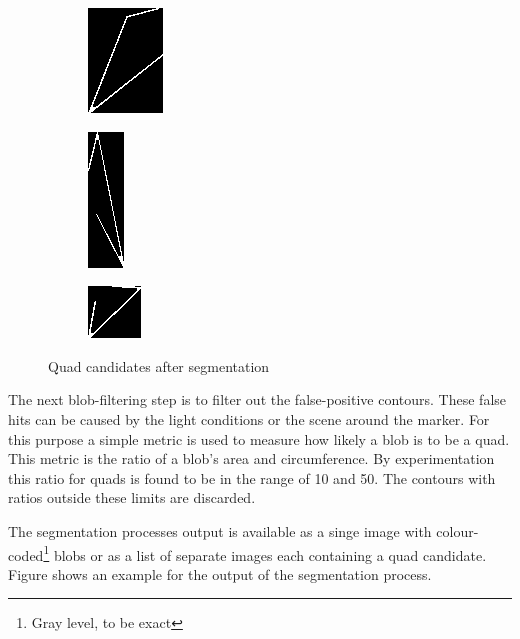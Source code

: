 \begin{figure}[ht]
	\begin{subfigure}{0.3\textwidth}
		\centering
		\includegraphics{figures/quad3.png}
	\end{subfigure}
	\begin{subfigure}{0.3\textwidth}
		\centering
		\includegraphics{figures/quad4.png}
	\end{subfigure}
	\begin{subfigure}{0.3\textwidth}
		\centering
		\includegraphics{figures/quad5.png}
	\end{subfigure}
	\caption{Quad candidates after segmentation}
	\label{fig:segmentationOutput}
\end{figure}

The next blob-filtering step is to filter out the false-positive contours.
These false hits can be caused by the light conditions or the scene around the marker.
For this purpose a simple metric is used to measure how likely a blob is to be a quad. 
This metric is the ratio of a blob's area and circumference. 
By experimentation this ratio for quads is found to be in the range of 10 and 50.
The contours with ratios outside these limits are discarded.

The segmentation processes output is available as a singe image with colour-coded\footnote{Gray level, to be exact} blobs or as a list of separate images each containing a quad candidate.
Figure  shows an example for the output of the segmentation process.

